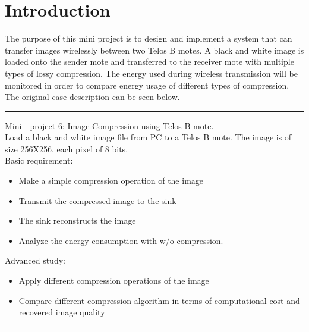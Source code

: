 
%

\section{Introduction}
The purpose of this mini project is to design and implement a system that can transfer images wirelessly between two Telos B motes. A black and white image is loaded onto the sender mote and transferred to the receiver mote with multiple types of lossy compression. The energy used during wireless transmission will be monitored in order to compare energy usage of different types  of compression. The original case description can be seen below.

\begin{center}
\noindent\rule{4cm}{0.4pt}
\end{center}
Mini - project 6: Image Compression using Telos B mote.\\
Load a black and white image file from PC to a Telos B mote. The image is of size 256X256, each pixel of 8 bits.\\
Basic requirement:
\begin{itemize}
\item Make a simple compression operation of the image
\item Transmit the compressed image to the sink
\item The sink reconstructs the image
\item Analyze the energy consumption with w/o compression. 
\end{itemize}
Advanced study:
\begin{itemize}
\item Apply different compression operations of the image
\item Compare different compression algorithm in terms of computational cost and recovered image quality
\end{itemize}
\begin{center}
\noindent\rule{4cm}{0.4pt}
\end{center}

%